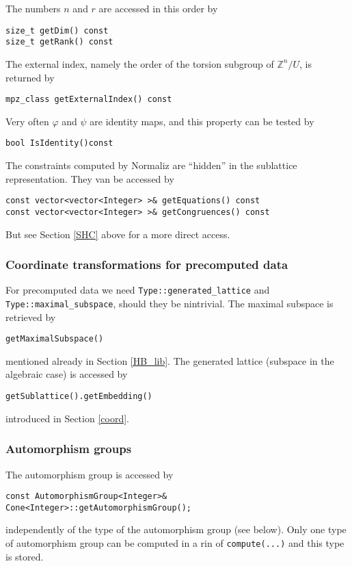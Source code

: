 \documentclass[12pt,a4paper]{scrartcl}
\theoremstyle{definition}
\let\phi=\varphi
\def\ZZ{{\mathbb Z}}
\begin{document}
\begin{small}
The numbers $n$ and $r$ are accessed in this order by
\begin{Verbatim}
size_t getDim() const
size_t getRank() const
\end{Verbatim}
The external index, namely the order of the torsion subgroup of $\ZZ^n/U$, is returned by
\begin{Verbatim}
mpz_class getExternalIndex() const
\end{Verbatim}
Very often $\phi$ and $\psi$ are identity maps, and this property can be tested by
\begin{Verbatim}
bool IsIdentity()const
\end{Verbatim}
The constraints computed by Normaliz are ``hidden'' in the sublattice representation. They van be accessed by
\begin{Verbatim}
const vector<vector<Integer> >& getEquations() const
const vector<vector<Integer> >& getCongruences() const
\end{Verbatim}

But see Section \ref{SHC} above for a more direct access.

\subsubsection{Coordinate transformations for precomputed data}\label{coord_pre}

For precomputed data we need \verb|Type::generated_lattice| and \verb|Type::maximal_subspace|, should they be nintrivial. The maximal subspace is retrieved by
\begin{Verbatim}
getMaximalSubspace()
\end{Verbatim}
mentioned already in Section \ref{HB_lib}. The generated lattice (subspace in the algebraic case) is accessed by
\begin{Verbatim}
getSublattice().getEmbedding()
\end{Verbatim}
introduced in Section \ref{coord}.

\subsubsection{Automorphism groups}

The automorphism group is accessed by

\begin{Verbatim}
const AutomorphismGroup<Integer>& Cone<Integer>::getAutomorphismGroup();
\end{Verbatim}
independently of the type of the automorphism group (see below). Only one type of automorphism group can be computed in a rin of \verb|compute(...)| and this type is stored.


\end{small}
\end{document}
